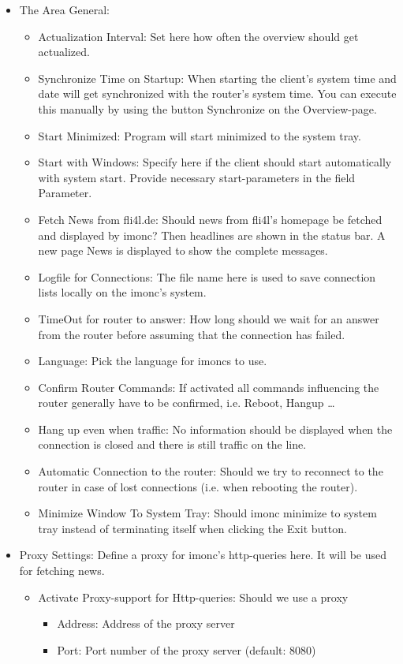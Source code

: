   \begin{itemize}
  \item The Area General:
    \begin{itemize}
    \item Actualization Interval: Set here how often the overview should get actualized.
    \item Synchronize Time on Startup: When starting the client's system time and date 
      will get synchronized with the router's system time. You can execute this manually
      by using the button Synchronize on the Overview-page.
    \item Start Minimized: Program will start minimized to the system tray.
    \item Start with Windows: Specify here if the client should start automatically 
      with system start. Provide necessary start-parameters in the field Parameter.
    \item Fetch News from fli4l.de: Should news from fli4l's homepage be fetched and
      displayed by imonc? Then headlines are shown in the status bar. A new page News
      is displayed to show the complete messages.
    \item Logfile for Connections: The file name here is used to save connection lists
      locally on the imonc's system.
    \item TimeOut for router to answer: How long should we wait for an answer from the
      router before assuming that the connection has failed.
    \item Language: Pick the language for imoncs to use.
    \item Confirm Router Commands: If activated all commands influencing the router
      generally have to be confirmed, i.e. Reboot, Hangup \ldots
    \item Hang up even when traffic: No information should be displayed when the
      connection is closed and there is still traffic on the line.
    \item Automatic Connection to the router: Should we try to reconnect to the router
      in case of lost connections (i.e. when rebooting the router).
    \item Minimize Window To System Tray: Should imonc minimize to system tray instead
      of terminating itself when clicking the Exit button.
    \end{itemize}

  \item Proxy Settings:
    Define a proxy for imonc's http-queries here. It will be used for fetching news.
    \begin{itemize}
    \item Activate Proxy-support for Http-queries: Should we use a proxy 
          \begin{itemize}
            \item Address: Address of the proxy server
            \item Port: Port number of the proxy server (default: 8080)
          \end{itemize}
    \end{itemize}
    

\end{itemize}
